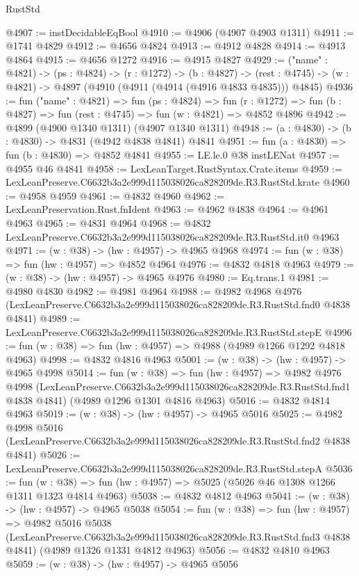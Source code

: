 \begin{lexlean}{RustStd}
\begin{coremodule}
@4907 := instDecidableEqBool
@4910 := @4906 (@4907 @4903 @1311)
@4911 := @1741 @4829
@4912 := @4656 @4824
@4913 := @4912 @4828
@4914 := @4913 @4864
@4915 := @4656 @1272
@4916 := @4915 @4827
@4929 := ("name" : @4821) ->
  (ps : @4824) ->
  (r : @1272) ->
  (b : @4827) ->
  (rest : @4745) -> (w : @4821) -> @4897 (@4910 (@4911 (@4914 (@4916 @4833 @4835))) @4845)
@4936 := fun ("name" : @4821) =>
  fun (ps : @4824) =>
  fun (r : @1272) => fun (b : @4827) => fun (rest : @4745) => fun (w : @4821) => @4852 @4896
@4942 := @4899 (@4900 @1340 @1311) (@4907 @1340 @1311)
@4948 := (a : @4830) -> (b : @4830) -> @4831 (@4942 @4838 @4841) @4841
@4951 := fun (a : @4830) => fun (b : @4830) => @4852 @4841
@4955 := LE.le.{0} @38 instLENat
@4957 := @4955 @46 @4841
@4958 := LexLeanTarget.RustSyntax.Crate.items
@4959 := LexLeanPreserve.C6632b3a2e999d115038026ca828209de.R3.RustStd.krate
@4960 := @4958 @4959
@4961 := @4832 @4960
@4962 := LexLeanPreservation.Rust.fnIdent
@4963 := @4962 @4838
@4964 := @4961 @4963
@4965 := @4831 @4964
@4968 := @4832 LexLeanPreserve.C6632b3a2e999d115038026ca828209de.R3.RustStd.it0 @4963
@4971 := (w : @38) -> (hw : @4957) -> @4965 @4968
@4974 := fun (w : @38) => fun (hw : @4957) => @4852 @4964
@4976 := @4832 @4818 @4963
@4979 := (w : @38) -> (hw : @4957) -> @4965 @4976
@4980 := Eq.trans.{1}
@4981 := @4980 @4830
@4982 := @4981 @4964
@4988 := @4982
    @4968
    @4976
    (LexLeanPreserve.C6632b3a2e999d115038026ca828209de.R3.RustStd.fnd0 @4838 @4841)
@4989 := LexLeanPreserve.C6632b3a2e999d115038026ca828209de.R3.RustStd.stepE
@4996 := fun (w : @38) => fun (hw : @4957) => @4988 (@4989 @1266 @1292 @4818 @4963)
@4998 := @4832 @4816 @4963
@5001 := (w : @38) -> (hw : @4957) -> @4965 @4998
@5014 := fun (w : @38) =>
  fun (hw : @4957) =>
  @4982
    @4976
    @4998
    (LexLeanPreserve.C6632b3a2e999d115038026ca828209de.R3.RustStd.fnd1 @4838 @4841)
    (@4989 @1296 @1301 @4816 @4963)
@5016 := @4832 @4814 @4963
@5019 := (w : @38) -> (hw : @4957) -> @4965 @5016
@5025 := @4982
    @4998
    @5016
    (LexLeanPreserve.C6632b3a2e999d115038026ca828209de.R3.RustStd.fnd2 @4838 @4841)
@5026 := LexLeanPreserve.C6632b3a2e999d115038026ca828209de.R3.RustStd.stepA
@5036 := fun (w : @38) => fun (hw : @4957) => @5025 (@5026 @46 @1308 @1266 @1311 @1323 @4814 @4963)
@5038 := @4832 @4812 @4963
@5041 := (w : @38) -> (hw : @4957) -> @4965 @5038
@5054 := fun (w : @38) =>
  fun (hw : @4957) =>
  @4982
    @5016
    @5038
    (LexLeanPreserve.C6632b3a2e999d115038026ca828209de.R3.RustStd.fnd3 @4838 @4841)
    (@4989 @1326 @1331 @4812 @4963)
@5056 := @4832 @4810 @4963
@5059 := (w : @38) -> (hw : @4957) -> @4965 @5056

\end{coremodule}
\end{lexlean}
